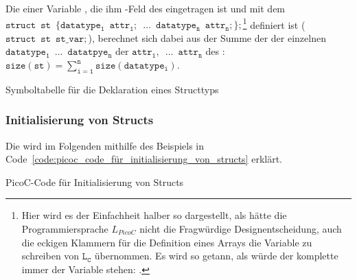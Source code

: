 \begin{Special_Paragraph}
  Die  einer Variable , die ihm -Feld des  eingetragen ist und mit dem  $\mathtt{struct\enspace st\enspace \{datatype_1\enspace attr_1;\enspace\ldots\enspace datatype_n\enspace attr_n;\};}$\footnote{Hier wird es der Einfachheit halber so dargestellt, als hätte die Programmiersprache $L_{PicoC}$ nicht die Fragwürdige Designentscheidung, auch die eckigen Klammern \smalltt{[]} für die Definition eines Arrays  die Variable zu schreiben von $\mathtt{L_C}$ übernommen. Es wird so getann, als würde der komplette  immer  der Variable stehen: .} definiert ist ($\mathtt{struct\enspace st\enspace st\_var;}$), berechnet sich dabei aus der Summe der  der einzelnen  $\mathtt{datatype_1\enspace \ldots\enspace datatpye_n}$ der  $\mathtt{attr_1,\enspace \ldots\enspace attr_n}$ des : $\mathtt{size(st) = \sum^n_{i=1} size(datatype_i)}$.
\end{Special_Paragraph}

\begin{code}
  \centering
  \caption{Symboltabelle für die Deklaration eines Structtyps}
  \label{code:symboltabelle_für_die_deklaration_eines_structtyps}
\end{code}

\subsubsection{Initialisierung von Structs}

Die  wird im Folgenden mithilfe des Beispiels in Code~\ref{code:picoc_code_für_initialisierung_von_structs} erklärt.

\begin{code}
  \centering
  \caption{PicoC-Code für Initialisierung von Structs}
  \label{code:picoc_code_für_initialisierung_von_structs}
\end{code}

